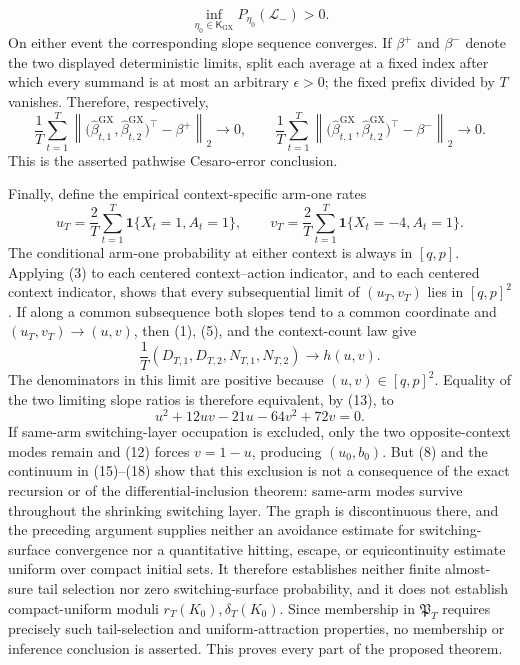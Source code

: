 \[
 \inf_{\eta_0\in\mathsf K_{\mathrm{GX}}}P_{\eta_0}(\mathcal L_-)>0. \tag{25}
\]
On either event the corresponding slope sequence converges. If \(\beta^+\) and \(\beta^-\) denote the two displayed deterministic limits, split each average at a fixed index after which every summand is at most an arbitrary \(\epsilon>0\); the fixed prefix divided by \(T\) vanishes. Therefore, respectively,
\[
 \frac1T\sum_{t=1}^T\left\|\bigl(\widehat\beta^{\mathrm{GX}}_{t,1},\widehat\beta^{\mathrm{GX}}_{t,2}\bigr)^\top-\beta^+\right\|_2\longrightarrow0,
 \qquad
 \frac1T\sum_{t=1}^T\left\|\bigl(\widehat\beta^{\mathrm{GX}}_{t,1},\widehat\beta^{\mathrm{GX}}_{t,2}\bigr)^\top-\beta^-\right\|_2\longrightarrow0.
\]
This is the asserted pathwise Cesaro-error conclusion.

Finally, define the empirical context-specific arm-one rates
\[
 u_T=\frac2T\sum_{t=1}^T\mathbf1\{X_t=1,A_t=1\},\qquad
 v_T=\frac2T\sum_{t=1}^T\mathbf1\{X_t=-4,A_t=1\}.
\]
The conditional arm-one probability at either context is always in \([q,p]\). Applying (3) to each centered context--action indicator, and to each centered context indicator, shows that every subsequential limit of \((u_T,v_T)\) lies in \([q,p]^2\). If along a common subsequence both slopes tend to a common coordinate and \((u_T,v_T)\to(u,v)\), then (1), (5), and the context-count law give
\[
 \frac1T(D_{T,1},D_{T,2},N_{T,1},N_{T,2})\longrightarrow h(u,v).
\]
The denominators in this limit are positive because \((u,v)\in[q,p]^2\). Equality of the two limiting slope ratios is therefore equivalent, by (13), to
\[
 u^2+12uv-21u-64v^2+72v=0.
\]
If same-arm switching-layer occupation is excluded, only the two opposite-context modes remain and (12) forces \(v=1-u\), producing \((u_0,b_0)\). But (8) and the continuum in (15)--(18) show that this exclusion is not a consequence of the exact recursion or of the differential-inclusion theorem: same-arm modes survive throughout the shrinking switching layer. The graph is discontinuous there, and the preceding argument supplies neither an avoidance estimate for switching-surface convergence nor a quantitative hitting, escape, or equicontinuity estimate uniform over compact initial sets. It therefore establishes neither finite almost-sure tail selection nor zero switching-surface probability, and it does not establish compact-uniform moduli \(r_T(K_0),\delta_T(K_0)\). Since membership in \(\mathfrak P_T\) requires precisely such tail-selection and uniform-attraction properties, no membership or inference conclusion is asserted. This proves every part of the proposed theorem.
